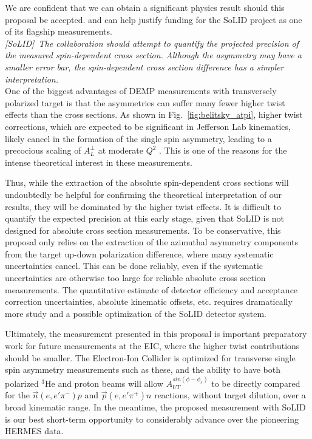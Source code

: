 We are confident that we can obtain a significant physics result should this
proposal be accepted.  and can help justify funding for the SoLID project as
one of its flagship measurements.
\\[0.2ex]

{\it [SoLID]\ The collaboration should attempt to quantify the projected
  precision of the measured spin-dependent cross section.  Although the
  asymmetry may have a smaller error bar, the spin-dependent cross section
  difference has a simpler interpretation.}\\[0.2ex]

One of the biggest advantages of DEMP measurements with transversely polarized
target is that the asymmetries can suffer many fewer higher twist effects than
the cross sections.  As shown in Fig.~\ref{fig:belitsky_atpi}, higher twist
corrections, which are expected to be significant in Jefferson Lab kinematics,
likely cancel in the formation of the single spin asymmetry, leading to a
precocious scaling of $A_L^{\perp}$ at moderate $Q^2$ \cite{Fr99, belitsky}.
This is one of the reasons for the intense theoretical interest in these
measurements.

Thus, while the extraction of the absolute spin-dependent cross sections will
undoubtedly be helpful for confirming the theoretical interpretation of our
results, they will be dominated by the higher twist effects.  It is difficult
to quantify the expected precision at this early stage, given that SoLID is not
designed for absolute cross section measurements.  To be conservative, this
proposal only relies on the extraction of the azimuthal asymmetry components
from the target up-down polarization difference, where many systematic
uncertainties cancel.  This can be done reliably, even if the systematic
uncertainties are otherwise too large for reliable absolute cross section
measurements.  The quantitative estimate of detector efficiency and acceptance
correction uncertainties, absolute kinematic offsets, etc. requires
dramatically more study and a possible optimization of the SoLID detector
system.

Ultimately, the measurement presented in this proposal is important preparatory
work for future measurements at the EIC, where the higher twist contributions
should be smaller.  The Electron-Ion Collider is optimized for transverse
single spin asymmetry measurements such as these, and the ability to have both
polarized $^3$He and proton beams will allow $A_{UT}^{sin(\phi-\phi_s)}$ to be
directly compared for the $\vec{n}(e,e'\pi^-)p$ and $\vec{p}(e,e'\pi^+)n$
reactions, without target dilution, over a broad kinematic range.  In the
meantime, the proposed measurement with SoLID is our best short-term
opportunity to considerably advance over the pioneering HERMES data.

